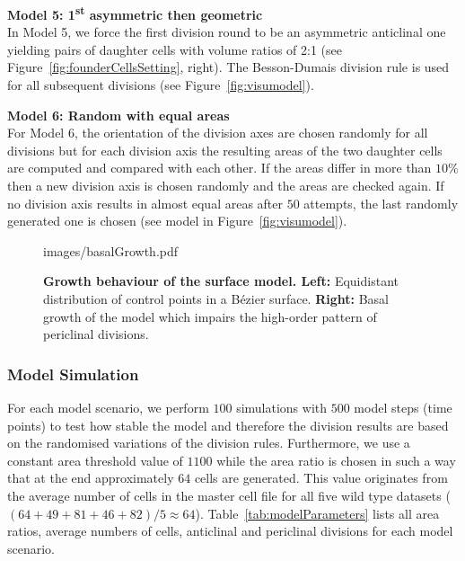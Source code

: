\documentclass[11pt,a4paper, final]{article}
\begin{document}
\noindent
\textbf{Model 5: 1\textsuperscript{st} asymmetric then geometric}\\
\noindent
In Model 5, we force the first division round to be an asymmetric anticlinal one yielding pairs of daughter cells with volume ratios of 2:1 (see Figure~\ref{fig:founderCellsSetting}, right). The Besson-Dumais division rule is used for all subsequent divisions (see Figure~\ref{fig:visumodel}).

\noindent
\textbf{Model 6: Random with equal areas}\\
\noindent
For Model 6, the orientation of the division axes are chosen randomly for all divisions but for each division axis the resulting areas of the two daughter cells are computed and compared with each other. If the areas differ in more than $10\%$ then a new division axis is chosen randomly and the areas are checked again. If no division axis results in almost equal areas after $50$ attempts, the last randomly generated one is chosen (see model in Figure~\ref{fig:visumodel}).
\clearpage

%
\begin{figure}[htbp]
	\begin{center}
		\begin{overpic}[width=1.\linewidth]{images/basalGrowth.pdf}
		\end{overpic}
\caption[]
{
{\bf Growth behaviour of the surface model. Left:} Equidistant distribution of control points in a B\'ezier surface. \textbf{Right:} Basal growth of the model which impairs the high-order pattern of periclinal divisions.
}
	\label{fig:basalGrowth}
	\end{center}
\end{figure}
%

\subsubsection{Model Simulation}
\noindent
For each model scenario, we perform $100$ simulations with $500$ model steps (time points) to test how stable the model and therefore the division results are based on the randomised variations of the division rules. Furthermore, we use a constant area threshold value of $1100$ while the area ratio is chosen in such a way that at the end approximately $64$ cells are generated. This value originates from the average number of cells in the master cell file for all five wild type datasets ($(64+49+81+46+82)/5 \approx 64$). Table~\ref{tab:modelParameters} lists all area ratios, average numbers of cells, anticlinal and periclinal divisions for each model scenario.
\end{document}
